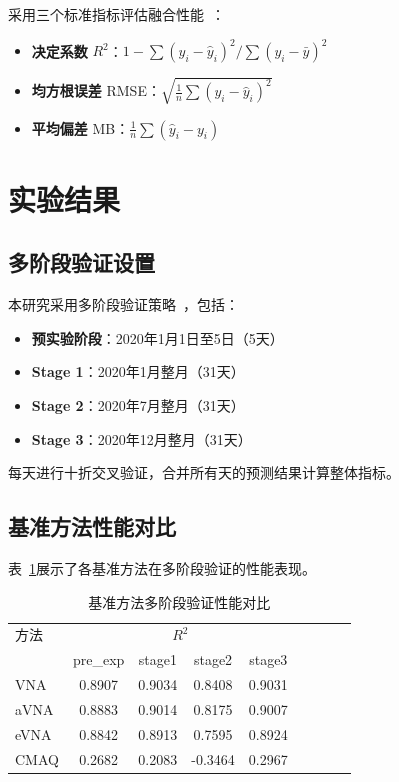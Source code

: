 \documentclass[UTF8, a4paper, 12pt]{article}
\begin{document}
采用三个标准指标评估融合性能~\cite{liu2019spatial}：

\begin{itemize}
    \item \textbf{决定系数} $R^2$：$1 - \sum(y_i - \hat{y}_i)^2 / \sum(y_i - \bar{y})^2$

    \item \textbf{均方根误差} RMSE：$\sqrt{\frac{1}{n}\sum(y_i - \hat{y}_i)^2}$

    \item \textbf{平均偏差} MB：$\frac{1}{n}\sum(\hat{y}_i - y_i)$
\end{itemize}

\section{实验结果}

\subsection{多阶段验证设置}

本研究采用多阶段验证策略~\cite{rodriguez2025downscaling}，包括：

\begin{itemize}
    \item \textbf{预实验阶段}：2020年1月1日至5日（5天）
    \item \textbf{Stage 1}：2020年1月整月（31天）
    \item \textbf{Stage 2}：2020年7月整月（31天）
    \item \textbf{Stage 3}：2020年12月整月（31天）
\end{itemize}

每天进行十折交叉验证，合并所有天的预测结果计算整体指标。

\subsection{基准方法性能对比}

表~\ref{tab:benchmark}展示了各基准方法在多阶段验证的性能表现。

\begin{table}[htbp]
\centering
\caption{基准方法多阶段验证性能对比}
\label{tab:benchmark}
\begin{tabular}{@{}lcccccccc@{}}
\toprule
方法 & \multicolumn{4}{c}{$R^2$} \\
      & pre\_exp & stage1 & stage2 & stage3 \\
\midrule
VNA & 0.8907 & 0.9034 & 0.8408 & 0.9031 \\
aVNA & 0.8883 & 0.9014 & 0.8175 & 0.9007 \\
eVNA & 0.8842 & 0.8913 & 0.7595 & 0.8924 \\
CMAQ & 0.2682 & 0.2083 & -0.3464 & 0.2967 \\
\bottomrule
\end{tabular}
\end{table}
\end{document}
